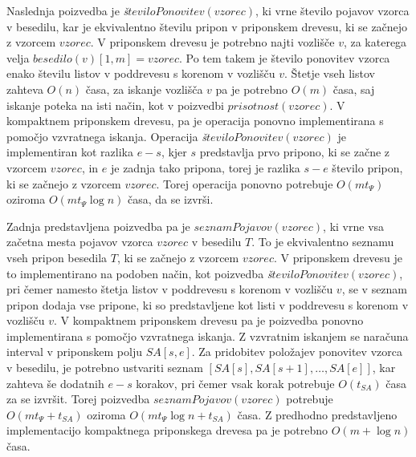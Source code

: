 Naslednja poizvedba je \textit{š}$teviloPonovitev(vzorec)$, ki vrne  število pojavov vzorca v besedilu, kar je ekvivalentno številu pripon v priponskem drevesu, ki se začnejo z vzorcem $vzorec$. V priponskem drevesu je potrebno najti vozlišče $v$, za katerega velja $besedilo(v)[1,m]=vzorec$. Po tem takem je število ponovitev vzorca enako številu listov v poddrevesu s korenom v vozlišču $v$. Štetje vseh listov zahteva $O(n)$ časa, za iskanje vozlišča $v$ pa je potrebno $O(m)$ časa, saj iskanje poteka na isti način, kot v poizvedbi  $prisotnost(vzorec)$. V kompaktnem priponskem drevesu, pa je operacija ponovno implementirana s pomočjo vzvratnega iskanja. Operacija \textit{š}$teviloPonovitev(vzorec)$ je implementiran kot razlika $e-s$, kjer $s$ predstavlja prvo pripono, ki se začne z vzorcem $vzorec$, in $e$ je zadnja tako pripona, torej je razlika $s-e$ število pripon, ki se začnejo z vzorcem $vzorec$. Torej operacija ponovno potrebuje $O(mt_\Psi)$ oziroma $O(mt_\Psi\log{n})$ časa, da se izvrši.

Zadnja predstavljena poizvedba pa je $seznamPojavov(vzorec)$, ki vrne vsa začetna mesta pojavov vzorca $vzorec$  v besedilu $T$. To je ekvivalentno seznamu vseh pripon besedila $T$, ki se začnejo z vzorcem $vzorec$. V priponskem drevesu je to implementirano na podoben način, kot poizvedba \textit{š}$teviloPonovitev(vzorec)$, pri čemer namesto štetja listov v poddrevesu s korenom v vozlišču $v$, se v seznam pripon dodaja vse pripone, ki so predstavljene kot listi v poddrevesu s korenom v vozlišču $v$. V kompaktnem priponskem drevesu pa je poizvedba ponovno implementirana s pomočjo vzvratnega iskanja. Z vzvratnim iskanjem se naračuna interval v priponskem polju $SA[s,e]$. Za pridobitev položajev ponovitev vzorca v besedilu, je potrebno ustvariti seznam $[SA[s],SA[s+1],\dots,SA[e]]$, kar zahteva še dodatnih $e-s$ korakov, pri čemer vsak korak potrebuje $O(t_{SA})$ časa za se izvršit. Torej poizvedba $seznamPojavov(vzorec)$ potrebuje $O(mt_\Psi+t_{SA})$ oziroma $O(mt_\Psi \log{n}+t_{SA})$ časa. Z predhodno predstavljeno implementacijo kompaktnega priponskega drevesa pa je potrebno $O(m+\log{n})$ časa.

